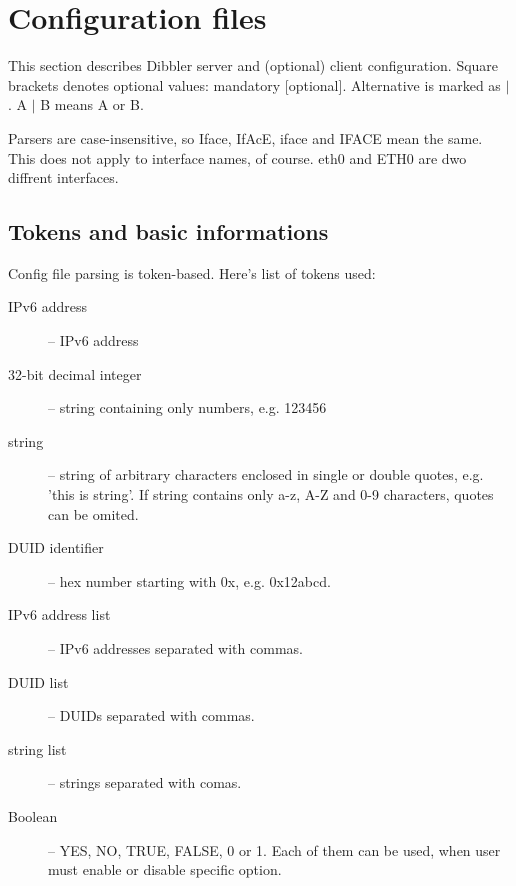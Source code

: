 
\section{Configuration files}

This section describes Dibbler server and (optional) client
configuration. Square brackets denotes optional values: mandatory
[optional]. Alternative is marked as $\mid$. A $\mid$ B means A or B.

Parsers are case-insensitive, so Iface, IfAcE, iface and IFACE mean the
same. This does not apply to interface names, of course. eth0 and ETH0
are dwo diffrent interfaces.

\subsection{Tokens and basic informations}
Config file parsing is token-based. Here's list of tokens used:
\begin{description}
\item[IPv6 address] -- IPv6 address 
\item[32-bit decimal integer] -- string containing only numbers, e.g. 123456
\item[string] -- string of arbitrary characters enclosed in single or double
  quotes, e.g. 'this is string'. If string contains only a-z, A-Z and
  0-9 characters, quotes can be omited.
\item[DUID identifier] -- hex number starting with 0x, e.g. 0x12abcd.
\item[IPv6 address list] -- IPv6 addresses separated with commas.
\item[DUID list] -- DUIDs separated with commas.
\item[string list] -- strings separated with comas.
\item[Boolean] -- YES, NO, TRUE, FALSE, 0 or 1. Each of them can be
  used, when user must enable or disable specific option.
\end{description}



